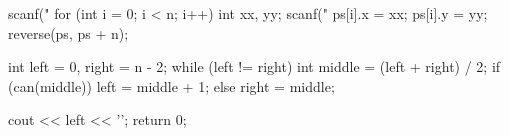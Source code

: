\documentclass[12pt, titlepage]{article}
\begin{document}
\begin{cppcode}
{    scanf("%
    for (int i = 0; i < n; i++) {
        int xx, yy;
        scanf("%
        ps[i].x = xx;
        ps[i].y = yy;
    }
    reverse(ps, ps + n);
   
    int left = 0, right = n - 2;
    while (left != right) {
        int middle = (left + right) / 2;
        if (can(middle))
            left = middle + 1;
        else
            right = middle;
    }

    cout << left << '\n';
    return 0;
}
\end{cppcode}
\end{document}
